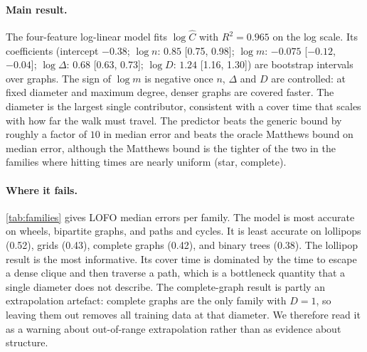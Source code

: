 \documentclass{article}
\begin{document}
\paragraph{Main result.} The four-feature log-linear model fits $\log\hat C$ with $R^2=0.965$ on the log scale. Its coefficients (intercept $-0.38$; $\log n$: $0.85$ [0.75, 0.98]; $\log m$: $-0.075$ [$-0.12$, $-0.04$]; $\log\Delta$: $0.68$ [0.63, 0.73]; $\log D$: $1.24$ [1.16, 1.30]) are bootstrap intervals over graphs. The sign of $\log m$ is negative once $n$, $\Delta$ and $D$ are controlled: at fixed diameter and maximum degree, denser graphs are covered faster. The diameter is the largest single contributor, consistent with a cover time that scales with how far the walk must travel. The predictor beats the generic bound by roughly a factor of $10$ in median error and beats the oracle Matthews bound on median error, although the Matthews bound is the tighter of the two in the families where hitting times are nearly uniform (star, complete).

\paragraph{Where it fails.} \cref{tab:families} gives LOFO median errors per family. The model is most accurate on wheels, bipartite graphs, and paths and cycles. It is least accurate on lollipops (0.52), grids (0.43), complete graphs (0.42), and binary trees (0.38). The lollipop result is the most informative. Its cover time is dominated by the time to escape a dense clique and then traverse a path, which is a bottleneck quantity that a single diameter does not describe. The complete-graph result is partly an extrapolation artefact: complete graphs are the only family with $D=1$, so leaving them out removes all training data at that diameter. We therefore read it as a warning about out-of-range extrapolation rather than as evidence about structure.
\end{document}
